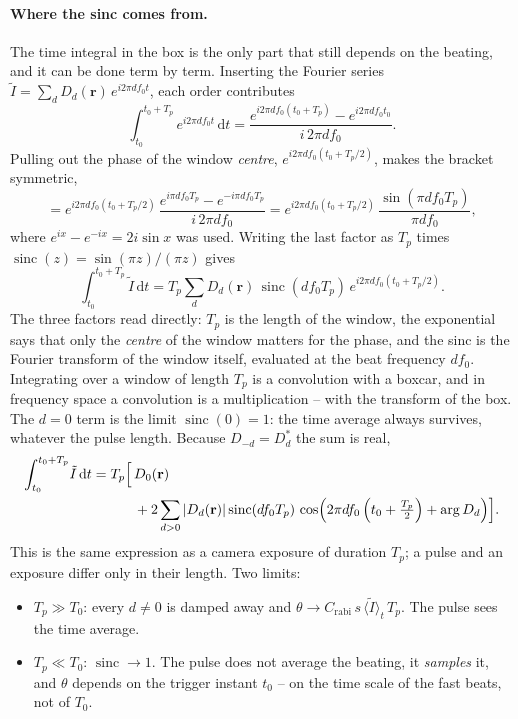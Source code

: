 \paragraph{Where the sinc comes from.}
The time integral in the box is the only part that still depends on the
beating, and it can be done term by term. Inserting the Fourier series
$\tilde I=\sum_d D_d(\mathbf r)\,e^{i2\pi df_0t}$, each order contributes
\begin{equation}
\int_{t_0}^{t_0+T_p}\!\! e^{i2\pi df_0t}\,\mathrm dt
=\frac{e^{i2\pi df_0(t_0+T_p)}-e^{i2\pi df_0t_0}}{i\,2\pi df_0} .
\end{equation}
Pulling out the phase of the window \emph{centre}, $e^{i2\pi
df_0(t_0+T_p/2)}$, makes the bracket symmetric,
\begin{equation}
=e^{i2\pi df_0\left(t_0+T_p/2\right)}\,
\frac{e^{i\pi df_0T_p}-e^{-i\pi df_0T_p}}{i\,2\pi df_0}
=e^{i2\pi df_0\left(t_0+T_p/2\right)}\,
\frac{\sin\!\left(\pi df_0T_p\right)}{\pi df_0} ,
\end{equation}
where $e^{ix}-e^{-ix}=2i\sin x$ was used. Writing the last factor as $T_p$
times $\operatorname{sinc}(z)=\sin(\pi z)/(\pi z)$ gives
\begin{equation}
\int_{t_0}^{t_0+T_p}\!\tilde I\,\mathrm dt
=T_p\sum_d D_d(\mathbf r)\,\operatorname{sinc}(d f_0T_p)\,
e^{i2\pi df_0\left(t_0+T_p/2\right)} .
\end{equation}
The three factors read directly: $T_p$ is the length of the window, the
exponential says that only the \emph{centre} of the window matters for the
phase, and the sinc is the Fourier transform of the window itself, evaluated at
the beat frequency $df_0$. Integrating over a window of length $T_p$ is a
convolution with a boxcar, and in frequency space a convolution is a
multiplication -- with the transform of the box. The $d=0$ term is the limit
$\operatorname{sinc}(0)=1$: the time average always survives, whatever the
pulse length. Because $D_{-d}=D_d^*$ the sum is real,
\begin{equation}
\begin{split}
\int_{t_0}^{t_0+T_p}\!\tilde I\,\mathrm dt
=T_p\Bigl[\,&D_0(\mathbf r)\\
&+2\sum_{d>0}\left|D_d(\mathbf r)\right|
\operatorname{sinc}(df_0T_p)\,
\cos\!\left(2\pi df_0\left(t_0+\tfrac{T_p}{2}\right)+\arg D_d\right)\Bigr].
\end{split}
\end{equation}
This is the same expression as a camera exposure of duration $T_p$; a pulse and
an exposure differ only in their length. Two limits:
\begin{itemize}
\item $T_p\gg T_0$: every $d\neq0$ is damped away and
      $\theta\to C_\mathrm{rabi}\,s\,\langle\tilde I\rangle_t\,T_p$. The pulse
      sees the time average.
\item $T_p\ll T_0$: $\operatorname{sinc}\to1$. The pulse does not average the
      beating, it \emph{samples} it, and $\theta$ depends on the trigger
      instant $t_0$ -- on the time scale of the fast beats, not of $T_0$.
\end{itemize}

